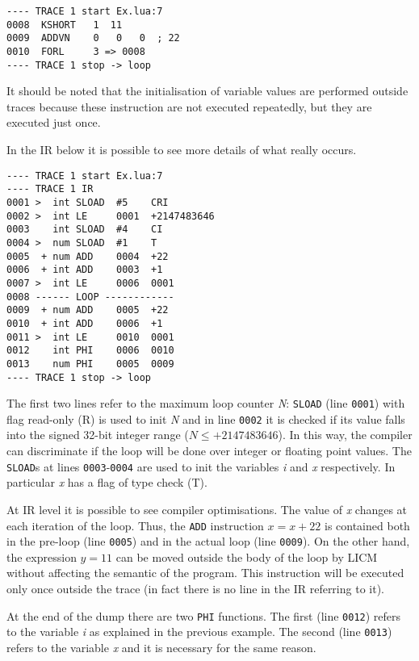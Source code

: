 \begin{lstlisting}[style=DumpStyle]
---- TRACE 1 start Ex.lua:7
0008  KSHORT   1  11
0009  ADDVN    0   0   0  ; 22
0010  FORL     3 => 0008
---- TRACE 1 stop -> loop
\end{lstlisting}

\noindent
It should be noted that the initialisation of variable values are performed outside traces because these instruction are not executed repeatedly, but they are executed just once. 

In the IR below it is possible to see more details of what really occurs.

\begin{multicols}{2}
\begin{lstlisting}[style=DumpStyle]
---- TRACE 1 start Ex.lua:7
---- TRACE 1 IR
0001 >  int SLOAD  #5    CRI
0002 >  int LE     0001  +2147483646
0003    int SLOAD  #4    CI
0004 >  num SLOAD  #1    T
0005  + num ADD    0004  +22 
0006  + int ADD    0003  +1  
0007 >  int LE     0006  0001
0008 ------ LOOP ------------
0009  + num ADD    0005  +22 
0010  + int ADD    0006  +1  
0011 >  int LE     0010  0001
0012    int PHI    0006  0010
0013    num PHI    0005  0009
---- TRACE 1 stop -> loop
\end{lstlisting}
\end{multicols} 

\noindent
The first two lines refer to the maximum loop counter \textit{N}: \texttt{SLOAD} (line \texttt{0001}) with flag read-only (R) is used to init \textit{N} and in line \texttt{0002} it is checked if its value falls into the signed 32-bit integer range ($N\leq+2147483646$). In this way, the compiler can discriminate if the loop will be done over integer or floating point values. The \texttt{SLOAD}s at lines \texttt{0003}-\texttt{0004} are used to init the variables \textit{i} and \textit{x} respectively. In particular \textit{x} has a flag of type check (T).

At IR level it is possible to see compiler optimisations. The value of \textit{x} changes at each iteration of the loop. Thus, the \texttt{ADD} instruction $x=x+22$ is contained both in the pre-loop (line \texttt{0005}) and in the actual loop (line \texttt{0009}). On the other hand, the expression $y=11$ can be moved outside the body of the loop by LICM without affecting the semantic of the program. This instruction will be executed only once outside the trace (in fact there is no line in the IR referring to it).

At the end of the dump there are two \texttt{PHI} functions. The first (line \texttt{0012}) refers to the variable \textit{i} as explained in the previous example. The second (line \texttt{0013}) refers to the variable \textit{x} and it is necessary for the same reason.

